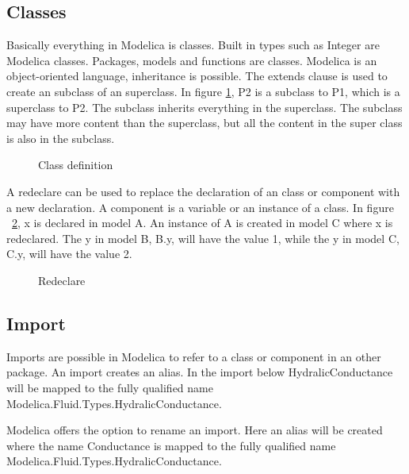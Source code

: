 \documentclass{cslthse-msc}
\begin{document}
\subsection{Classes}

Basically everything in Modelica is classes. Built in types such as Integer are Modelica classes. Packages, models and functions are classes. Modelica is an object-oriented language, inheritance is possible. The extends clause is used to create an subclass of an superclass. In figure \ref{fig:classDefinition}, P2 is a subclass to P1, which is a superclass to P2. The subclass inherits everything in the superclass. The subclass may have more content than the superclass, but all the content in the super class is also in the subclass. 

\begin{figure}[H]
    \centering
    \subfloat{{}}
    \caption{Class definition}
    \label{fig:classDefinition}
\end{figure}

A redeclare can be used to replace the declaration of an class or component with a new declaration. A component is a variable or an instance of a class. In figure ~\ref{fig:redeclare}, x is declared in model A. An instance of A is created in model C where x is redeclared. The y in model B, B.y, will have the value 1, while the y in model C, C.y, will have the value 2.

\begin{figure}[H]
	
    \caption{Redeclare}
    \label{fig:redeclare}
\end{figure}

\subsection{Import}
Imports are possible in Modelica to refer to a class or component in an other package. An import creates an alias. In the import below HydralicConductance will be mapped to the fully qualified name Modelica.Fluid.Types.HydralicConductance.



Modelica offers the option to rename an import. Here an alias will be created where the name Conductance is mapped to the fully qualified name Modelica.Fluid.Types.HydralicConductance.
\end{document}
